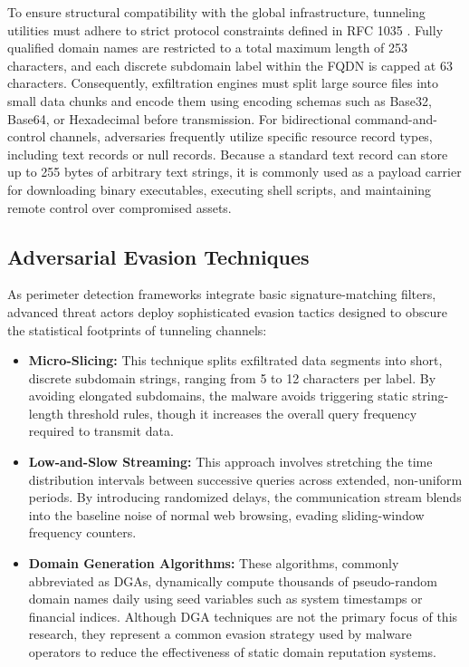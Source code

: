 \documentclass[14pt, a4paper, oneside]{report}
\begin{document}

To ensure structural compatibility with the global infrastructure, tunneling utilities must adhere to strict protocol constraints defined in RFC 1035 \cite{rfc1035}. Fully qualified domain names are restricted to a total maximum length of 253 characters, and each discrete subdomain label within the FQDN is capped at 63 characters. Consequently, exfiltration engines must split large source files into small data chunks and encode them using encoding schemas such as Base32, Base64, or Hexadecimal before transmission. For bidirectional command-and-control channels, adversaries frequently utilize specific resource record types, including text records or null records. Because a standard text record can store up to 255 bytes of arbitrary text strings, it is commonly used as a payload carrier for downloading binary executables, executing shell scripts, and maintaining remote control over compromised assets.

\subsection{Adversarial Evasion Techniques}
As perimeter detection frameworks integrate basic signature-matching filters, advanced threat actors deploy sophisticated evasion tactics designed to obscure the statistical footprints of tunneling channels:
\begin{itemize}
    \item \textbf{Micro-Slicing:} This technique splits exfiltrated data segments into short, discrete subdomain strings, ranging from 5 to 12 characters per label. By avoiding elongated subdomains, the malware avoids triggering static string-length threshold rules, though it increases the overall query frequency required to transmit data.
    \item \textbf{Low-and-Slow Streaming:} This approach involves stretching the time distribution intervals between successive queries across extended, non-uniform periods. By introducing randomized delays, the communication stream blends into the baseline noise of normal web browsing, evading sliding-window frequency counters.
    \item \textbf{Domain Generation Algorithms:} These algorithms, commonly abbreviated as DGAs, dynamically compute thousands of pseudo-random domain names daily using seed variables such as system timestamps or financial indices. Although DGA techniques are not the primary focus of this research, they represent a common evasion strategy used by malware operators to reduce the effectiveness of static domain reputation systems.
\end{itemize}
\end{document}
